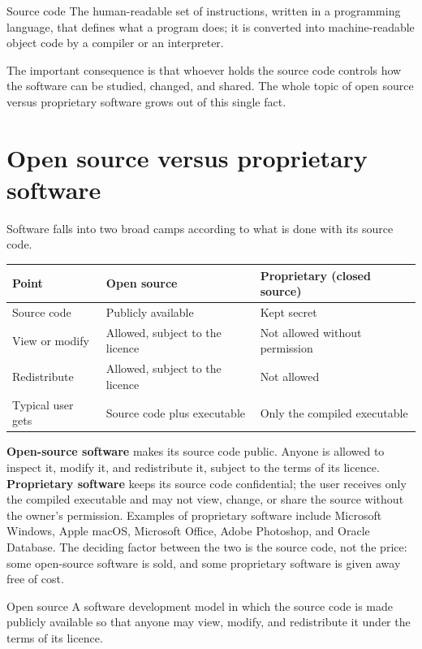 \begin{definitionbox}{Source code}
The human-readable set of instructions, written in a programming language,
that defines what a program does; it is converted into machine-readable
object code by a compiler or an interpreter.
\end{definitionbox}

The important consequence is that whoever holds the source code controls how
the software can be studied, changed, and shared. The whole topic of open
source versus proprietary software grows out of this single fact.

\section{Open source versus proprietary software}
Software falls into two broad camps according to what is done with its source
code.

\begin{center}
\begin{tabular}{p{}p{}p{}}
\toprule
\textbf{Point} & \textbf{Open source} & \textbf{Proprietary (closed source)} \\
\midrule
Source code & Publicly available & Kept secret \\
View or modify & Allowed, subject to the licence & Not allowed without permission \\
Redistribute & Allowed, subject to the licence & Not allowed \\
Typical user gets & Source code plus executable & Only the compiled executable \\
\bottomrule
\end{tabular}
\end{center}

\textbf{Open-source software} makes its source code public. Anyone is allowed
to inspect it, modify it, and redistribute it, subject to the terms of its
licence. \textbf{Proprietary software} keeps its source code confidential; the
user receives only the compiled executable and may not view, change, or share
the source without the owner's permission. Examples of proprietary software
include Microsoft Windows, Apple macOS, Microsoft Office, Adobe Photoshop, and
Oracle Database. The deciding factor between the two is the source code, not
the price: some open-source software is sold, and some proprietary software is
given away free of cost.

\begin{definitionbox}{Open source}
A software development model in which the source code is made publicly
available so that anyone may view, modify, and redistribute it under the
terms of its licence.
\end{definitionbox}

